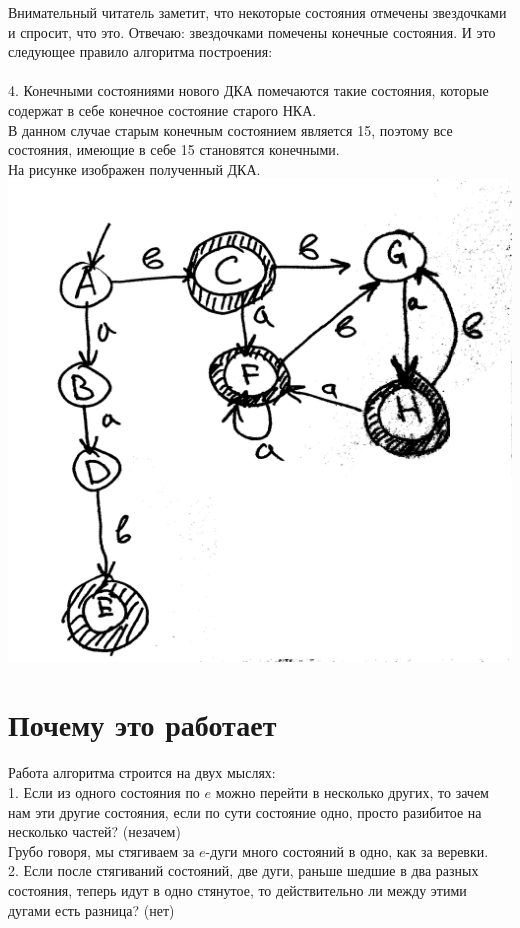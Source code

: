 \documentclass[14pt]{extreport}
\begin{document}
	Внимательный читатель заметит, что некоторые состояния отмечены звездочками и
	спросит, что это. Отвечаю: звездочками помечены конечные состояния. И это следующее
	правило алгоритма построения:\\\\
	4. Конечными состояниями нового ДКА помечаются такие состояния, которые содержат в себе
	конечное состояние старого НКА.\\
	В данном случае старым конечным состоянием является 15, поэтому все состояния, имеющие в себе
	15 становятся конечными.\\
	На рисунке изображен полученный ДКА.\\
	\includegraphics[scale=0.11]{data/pic2_2.png}\\
	\section{Почему это работает}
	Работа алгоритма строится на двух мыслях:\\
	1. Если из одного состояния по $e$ можно перейти в несколько других,
	то зачем нам эти другие состояния, если по сути состояние одно, просто
	разибитое на несколько частей? (незачем)\\
	Грубо говоря, мы стягиваем за $e$-дуги много состояний в одно, как за веревки.\\
	2. Если после стягиваний состояний, две дуги, раньше шедшие в два разных состояния,
	теперь идут в одно стянутое, то действительно ли между этими дугами есть разница? (нет)\\
	\newpage
\end{document}
